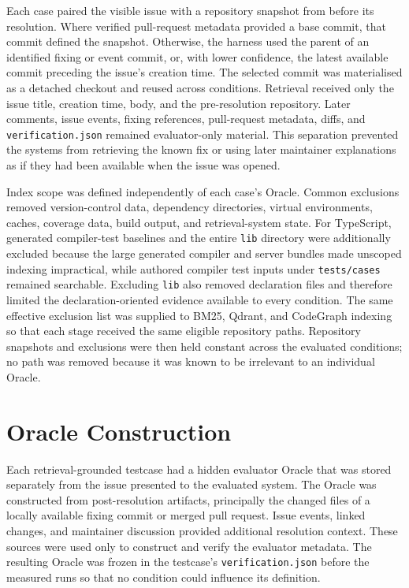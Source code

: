 Each case paired the visible issue with a repository snapshot from before its resolution. Where verified pull-request metadata provided a base commit, that commit defined the snapshot. Otherwise, the harness used the parent of an identified fixing or event commit, or, with lower confidence, the latest available commit preceding the issue's creation time. The selected commit was materialised as a detached checkout and reused across conditions. Retrieval received only the issue title, creation time, body, and the pre-resolution repository. Later comments, issue events, fixing references, pull-request metadata, diffs, and \texttt{verification.json} remained evaluator-only material. This separation prevented the systems from retrieving the known fix or using later maintainer explanations as if they had been available when the issue was opened.

Index scope was defined independently of each case's Oracle. Common exclusions removed version-control data, dependency directories, virtual environments, caches, coverage data, build output, and retrieval-system state. For TypeScript, generated compiler-test baselines and the entire \texttt{lib} directory were additionally excluded because the large generated compiler and server bundles made unscoped indexing impractical, while authored compiler test inputs under \texttt{tests/cases} remained searchable. Excluding \texttt{lib} also removed declaration files and therefore limited the declaration-oriented evidence available to every condition. The same effective exclusion list was supplied to BM25, Qdrant, and CodeGraph indexing so that each stage received the same eligible repository paths. Repository snapshots and exclusions were then held constant across the evaluated conditions; no path was removed because it was known to be irrelevant to an individual Oracle.

\section{Oracle Construction}\label{sec:oracle-construction}

Each retrieval-grounded testcase had a hidden evaluator Oracle that was stored separately from the issue presented to the evaluated system. The Oracle was constructed from post-resolution artifacts, principally the changed files of a locally available fixing commit or merged pull request. Issue events, linked changes, and maintainer discussion provided additional resolution context. These sources were used only to construct and verify the evaluator metadata. The resulting Oracle was frozen in the testcase's \texttt{verification.json} before the measured runs so that no condition could influence its definition.

